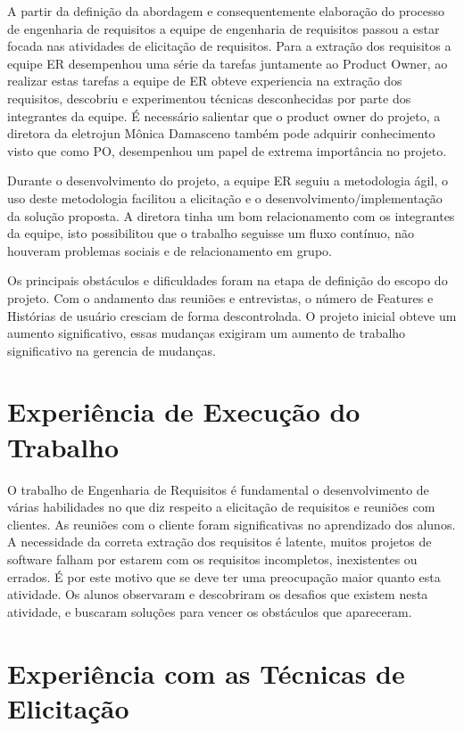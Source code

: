 A partir da definição da abordagem e consequentemente elaboração do processo de engenharia de requisitos a equipe de engenharia de requisitos passou a estar focada nas atividades de elicitação de requisitos. Para a extração dos requisitos a equipe ER desempenhou uma série da tarefas juntamente ao Product Owner, ao realizar estas tarefas a equipe de ER obteve experiencia na extração dos requisitos, descobriu e experimentou técnicas desconhecidas por parte dos integrantes da equipe.  É necessário salientar que o product owner do projeto, a diretora da eletrojun Mônica Damasceno também pode adquirir conhecimento visto que como PO, desempenhou um papel de extrema importância no projeto.

Durante o desenvolvimento do projeto, a equipe ER seguiu a metodologia ágil, o uso deste metodologia facilitou a elicitação e o desenvolvimento/implementação da solução proposta. A diretora tinha um bom relacionamento com os integrantes da equipe, isto possibilitou que o trabalho seguisse um fluxo contínuo, não houveram problemas sociais e de relacionamento em grupo.

Os principais obstáculos e dificuldades foram na etapa de definição do escopo do projeto. Com o andamento das reuniões e entrevistas, o número de Features e Histórias de usuário cresciam de forma descontrolada. O projeto inicial obteve um aumento significativo, essas mudanças exigiram um aumento de trabalho significativo na gerencia de mudanças.

\section{Experiência de Execução do Trabalho}
	O trabalho de Engenharia de Requisitos é fundamental o desenvolvimento de várias habilidades no que diz respeito a elicitação de requisitos e reuniões com clientes. As reuniões com o cliente foram significativas no aprendizado dos alunos. A necessidade da correta extração dos requisitos é latente, muitos projetos de software falham por estarem com os requisitos incompletos, inexistentes ou errados. É por este motivo que se deve ter uma preocupação maior quanto esta atividade. Os alunos observaram e descobriram os desafios que existem nesta atividade, e buscaram soluções para vencer os obstáculos que apareceram.

\section{Experiência com as Técnicas de Elicitação}


